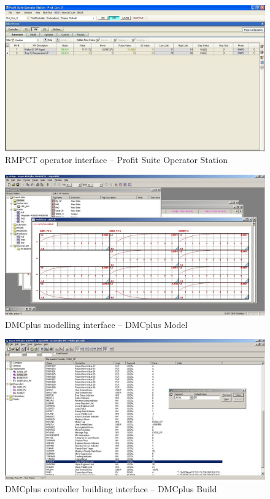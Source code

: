 \begin{landscape}
  \begin{figure}[htbp]
    \centering
      \includegraphics[width=25cm]{graph/ss_rmpctpsos.jpg}
    \caption[RMPCT Profit Suite Operator Station interface]{RMPCT operator interface -- Profit Suite Operator Station}
    \label{fig:ssrmpctoperator}
  \end{figure}

  \begin{figure}[htbp]
    \centering
      \includegraphics[width=25cm]{graph/ss_dmcplusdmcmodel.jpg}
    \caption[DMCplus Model interface]{DMCplus modelling interface -- DMCplus Model}
    \label{fig:ssdmcplusmodel}
  \end{figure}

  \begin{figure}[htbp]
    \centering
      \includegraphics[width=25cm]{graph/ss_dmcplusdmcbuild.jpg}
    \caption[DMCplus Build interface]{DMCplus controller building interface -- DMCplus Build}
    \label{fig:ssdmcpluscontrolbuild}
  \end{figure}


\end{landscape}
